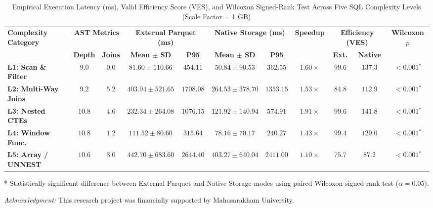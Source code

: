 \begin{table}[t!]
\centering
\begin{threeparttable}
\caption{Empirical Execution Latency (ms), Valid Efficiency Score (VES), and Wilcoxon Signed-Rank Test Across Five SQL Complexity Levels (Scale Factor = 1 GB)}
\label{tab:empirical_complexity_results}
\setlength{\tabcolsep}{5.5pt}
\renewcommand{\arraystretch}{1.15}
\begin{tabular}{@{}lcccccccccc@{}}
\toprule
\multirow{2}{*}{\textbf{Complexity Category}} & \multicolumn{2}{c}{\textbf{AST Metrics}} & \multicolumn{2}{c}{\textbf{External Parquet (ms)}} & \multicolumn{2}{c}{\textbf{Native Storage (ms)}} & \multirow{2}{*}{\textbf{Speedup}} & \multicolumn{2}{c}{\textbf{Efficiency (VES)}} & \multirow{2}{*}{\textbf{Wilcoxon $p$}} \\
\cmidrule(lr){2-3} \cmidrule(lr){4-5} \cmidrule(lr){6-7} \cmidrule(lr){9-10}
 & \textbf{Depth} & \textbf{Joins} & \textbf{Mean $\pm$ SD} & \textbf{P95} & \textbf{Mean $\pm$ SD} & \textbf{P95} & & \textbf{Ext.} & \textbf{Native} & \\
\midrule
\textbf{L1: Scan \& Filter} & $9.0$ & $0.0$ & $81.60 \pm 110.66$ & $454.11$ & $\mathbf{50.84 \pm 90.53}$ & $\mathbf{362.55}$ & $1.60\times$ & $99.6$ & $\mathbf{137.3}$ & $< 0.001$$^{*}$ \\
\textbf{L2: Multi-Way Joins} & $9.2$ & $5.2$ & $403.94 \pm 521.65$ & $1708.08$ & $\mathbf{264.53 \pm 378.70}$ & $\mathbf{1353.15}$ & $1.53\times$ & $84.8$ & $\mathbf{112.9}$ & $< 0.001$$^{*}$ \\
\textbf{L3: Nested CTEs} & $10.8$ & $4.6$ & $232.34 \pm 264.08$ & $1076.15$ & $\mathbf{121.92 \pm 140.94}$ & $\mathbf{574.91}$ & $1.91\times$ & $99.6$ & $\mathbf{141.8}$ & $< 0.001$$^{*}$ \\
\textbf{L4: Window Func.} & $10.8$ & $1.2$ & $111.52 \pm 80.60$ & $315.64$ & $\mathbf{78.16 \pm 70.17}$ & $\mathbf{240.27}$ & $1.43\times$ & $99.4$ & $\mathbf{129.0}$ & $< 0.001$$^{*}$ \\
\textbf{L5: Array / UNNEST} & $10.6$ & $3.0$ & $442.70 \pm 683.60$ & $2644.40$ & $\mathbf{403.27 \pm 640.04}$ & $\mathbf{2411.00}$ & $1.10\times$ & $75.7$ & $\mathbf{87.2}$ & $< 0.001$$^{*}$ \\
\bottomrule
\end{tabular}
\begin{tablenotes}\footnotesize
\item[*] Statistically significant difference between External Parquet and Native Storage modes using paired Wilcoxon signed-rank test ($\alpha = 0.05$).
\item \textit{Acknowledgment:} This research project was financially supported by Mahasarakham University.
\end{tablenotes}
\end{threeparttable}
\end{table}
